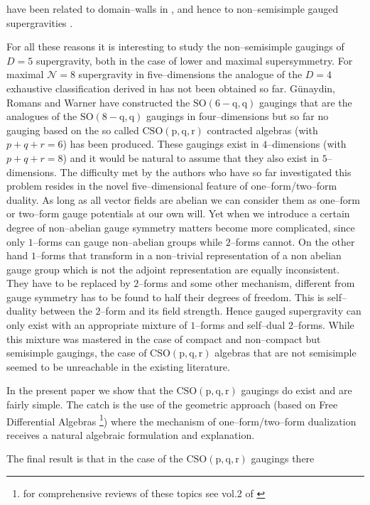 \documentclass[a4paper,12pt]{article}
\begin{document}
have been related to domain--walls in \cite{Cvetic:2000pn},
and hence to non--semisimple gauged supergravities \cite{Boonstra:1999mp}.
\par
For all these reasons it is interesting to study the
non--semisimple gaugings of $D=5$ supergravity, both in the case
of lower and maximal supersymmetry. For maximal $ \mathcal{N}=8$
supergravity in five--dimensions the analogue of the $D=4$
exhaustive classification derived in \cite{noi4D} has not been
obtained so far.  G\"unaydin, Romans and Warner have constructed
the $\mathrm{SO(6-q,q)}$ gaugings \cite{gunwar} that are the
analogues of the $\mathrm{SO(8-q,q)}$ gaugings in four--dimensions
but so far no gauging based on the so called $\mathrm{CSO(p,q,r)}$
contracted algebras (with $p+q+r=6$) has been produced. These
gaugings exist in $4$--dimensions (with $p+q+r=8$) and it would be
natural to assume that they also exist in $5$--dimensions. The
difficulty met by the authors who have so far investigated this
problem resides in the novel five--dimensional feature of
one--form/two--form duality.  As long as all vector fields are
abelian we can consider them as one--form or two--form gauge
potentials at our own will. Yet when we introduce a certain degree
of non--abelian gauge symmetry matters become more complicated,
since only $1$--forms can gauge non--abelian groups while
$2$--forms cannot. On the other hand $1$--forms that transform in
a non--trivial representation of a non abelian gauge group which
is not the adjoint representation are equally inconsistent. They
have to be replaced by $2$--forms and some other mechanism,
different from gauge symmetry has to be found to half their
degrees of freedom. This is self--duality between the $2$--form
and its field strength. Hence gauged supergravity can only exist
with an appropriate mixture of $1$--forms and self--dual
$2$--forms. While this mixture was mastered in the case of compact
and non--compact but semisimple gaugings, the case of
$\mathrm{CSO(p,q,r)}$ algebras that are not semisimple seemed to
be unreachable in the existing literature.
\par
In the present paper we show that the $\mathrm{CSO(p,q,r)}$ gaugings do exist and
are fairly simple. The catch is the use of the geometric approach (based on Free
Differential Algebras \footnote{for  comprehensive
reviews of these topics see vol.2 of
\cite{castdauriafre}}) where the mechanism of one--form/two--form dualization
receives a natural algebraic formulation and explanation.
\par
The final result is that in the case of the $\mathrm{CSO(p,q,r)}$ gaugings there
\end{document}
